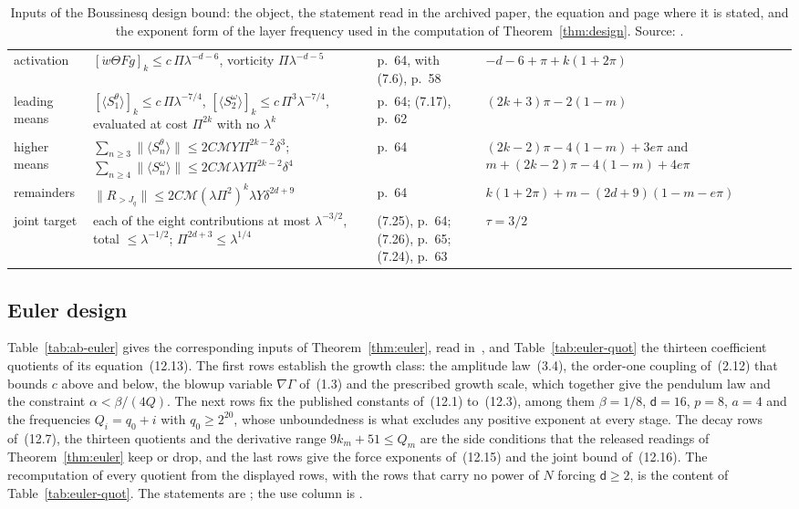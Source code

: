 \documentclass[11pt]{article}
\theoremstyle{remark}
\newcommand{\ev}[1]{\hspace{0.2em}{\small\textsf{[#1]}}}
\begin{document}
\begin{table}[t]
\begin{tabular}{@{}L{3.1cm}L{4.7cm}L{3.5cm}L{3.6cm}@{}}
activation & $[\dot w\Theta Fg]_{k}\le c\,\Pi\lambda^{-d-6}$, vorticity $\Pi\lambda^{-d-5}$ & p.~64, with (7.6), p.~58 & $-d-6+\pi+k(1+2\pi)$ \\
leading means & $[\langle S_{1}^{\theta}\rangle]_{k}\le c\,\Pi\lambda^{-7/4}$, $[\langle S_{2}^{\omega}\rangle]_{k}\le c\,\Pi^{3}\lambda^{-7/4}$, evaluated at cost $\Pi^{2k}$ with no $\lambda^{k}$ & p.~64; (7.17), p.~62 & $(2k+3)\pi-2(1-m)$ \\
higher means & $\sum_{n\ge3}\lVert\langle S_{n}^{\theta}\rangle\rVert\le2C\mathcal M Y\Pi^{2k-2}\delta^{3}$; $\sum_{n\ge4}\lVert\langle S_{n}^{\omega}\rangle\rVert\le2C\mathcal M\lambda Y\Pi^{2k-2}\delta^{4}$ & p.~64 & $(2k-2)\pi-4(1-m)+3e\pi$ and $m+(2k-2)\pi-4(1-m)+4e\pi$ \\
remainders & $\lVert R_{>J_{q}}\rVert\le2C\mathcal M(\lambda\Pi^{2})^{k}\lambda Y\delta^{2d+9}$ & p.~64 & $k(1+2\pi)+m-(2d+9)(1-m-e\pi)$ \\
joint target & each of the eight contributions at most $\lambda^{-3/2}$, total $\le\lambda^{-1/2}$; $\Pi^{2d+3}\le\lambda^{1/4}$ & (7.25), p.~64; (7.26), p.~65; (7.24), p.~63 & $\tau=3/2$ \\
\bottomrule
\end{tabular}
\caption{Inputs of the Boussinesq design bound: the object, the statement read in the archived paper, the equation and
page where it is stated, and the exponent form of the layer frequency used in the computation of Theorem~\ref{thm:design}.
Source: \cite{ab-boussinesq}.}\label{tab:ab-bous}
\end{table}

\subsection{Euler design}

Table~\ref{tab:ab-euler} gives the corresponding inputs of Theorem~\ref{thm:euler}, read in~\cite{ab-euler}, and
Table~\ref{tab:euler-quot} the thirteen coefficient quotients of its equation~(12.13). The first rows establish the
growth class: the amplitude law~(3.4), the order-one coupling of~(2.12) that bounds $c$ above and below, the blowup
variable $\nabla\Gamma$ of~(1.3) and the prescribed growth scale, which together give the pendulum law and the
constraint $\alpha<\beta/(4Q)$. The next rows fix the published constants of~(12.1) to~(12.3), among them
$\beta=1/8$, $\mathsf d=16$, $p=8$, $a=4$ and the frequencies $Q_{i}=q_{0}+i$ with $q_{0}\ge2^{20}$, whose unboundedness is
what excludes any positive exponent at every stage. The decay rows of~(12.7), the thirteen quotients and the derivative
range $9k_{m}+51\le Q_{m}$ are the side conditions that the released readings of Theorem~\ref{thm:euler} keep or drop,
and the last rows give the force exponents of~(12.15) and the joint bound of~(12.16). The recomputation of every
quotient from the displayed rows, with the rows that carry no power of $N$ forcing $\mathsf d\ge2$, is the content of
Table~\ref{tab:euler-quot}. The statements are \ev{V}; the use column is \ev{D}.
\end{document}

